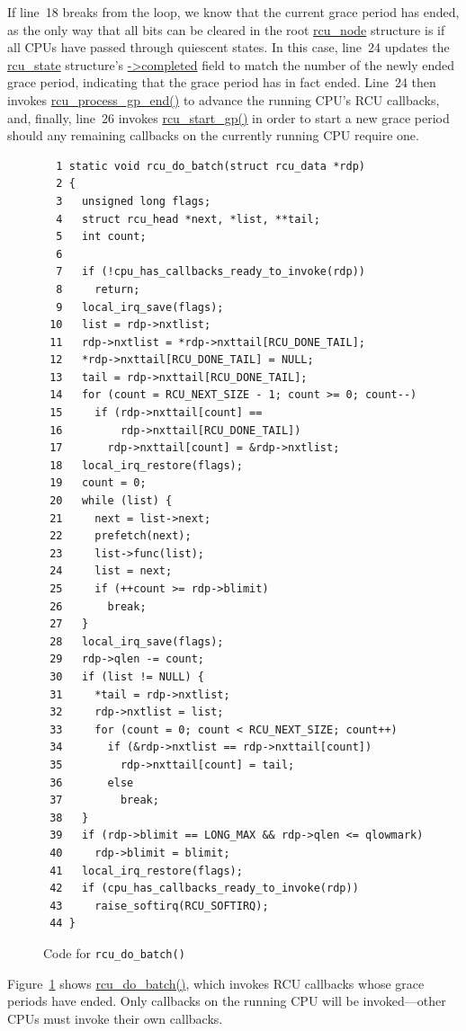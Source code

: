 If line~18 breaks from the loop, we know that the current grace period
has ended, as the only way that all bits can be cleared in the
root \url{rcu_node} structure is if all CPUs have passed through
quiescent states.
In this case, line~24 updates the \url{rcu_state} structure's
\url{->completed} field to match the number of the newly ended grace
period, indicating that the grace period has in fact ended.
Line~24 then invokes \url{rcu_process_gp_end()} to advance the
running CPU's RCU callbacks,
and, finally, line~26 invokes \url{rcu_start_gp()} in order to
start a new grace period should any remaining callbacks on the currently
running CPU require one.

\begin{figure}[tbp]
{ \scriptsize
\begin{verbatim}
  1 static void rcu_do_batch(struct rcu_data *rdp)
  2 {
  3   unsigned long flags;
  4   struct rcu_head *next, *list, **tail;
  5   int count;
  6 
  7   if (!cpu_has_callbacks_ready_to_invoke(rdp))
  8     return;
  9   local_irq_save(flags);
 10   list = rdp->nxtlist;
 11   rdp->nxtlist = *rdp->nxttail[RCU_DONE_TAIL];
 12   *rdp->nxttail[RCU_DONE_TAIL] = NULL;
 13   tail = rdp->nxttail[RCU_DONE_TAIL];
 14   for (count = RCU_NEXT_SIZE - 1; count >= 0; count--)
 15     if (rdp->nxttail[count] ==
 16         rdp->nxttail[RCU_DONE_TAIL])
 17       rdp->nxttail[count] = &rdp->nxtlist;
 18   local_irq_restore(flags);
 19   count = 0;
 20   while (list) {
 21     next = list->next;
 22     prefetch(next);
 23     list->func(list);
 24     list = next;
 25     if (++count >= rdp->blimit)
 26       break;
 27   }
 28   local_irq_save(flags);
 29   rdp->qlen -= count;
 30   if (list != NULL) {
 31     *tail = rdp->nxtlist;
 32     rdp->nxtlist = list;
 33     for (count = 0; count < RCU_NEXT_SIZE; count++)
 34       if (&rdp->nxtlist == rdp->nxttail[count])
 35         rdp->nxttail[count] = tail;
 36       else
 37         break;
 38   }
 39   if (rdp->blimit == LONG_MAX && rdp->qlen <= qlowmark)
 40     rdp->blimit = blimit;
 41   local_irq_restore(flags);
 42   if (cpu_has_callbacks_ready_to_invoke(rdp))
 43     raise_softirq(RCU_SOFTIRQ);
 44 }
\end{verbatim}
}
\caption{Code for {\tt rcu\_do\_batch()}}
\label{fig:app:rcuimpl:rcutreewt:Code for rcu-do-batch}
\end{figure}

Figure~\ref{fig:app:rcuimpl:rcutreewt:Code for rcu-do-batch}
shows \url{rcu_do_batch()}, which invokes RCU callbacks
whose grace periods have ended.
Only callbacks on the running CPU will be invoked---other CPUs must
invoke their own callbacks.

